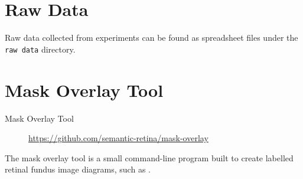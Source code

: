\section{Raw Data} \label{cha:raw_data}

Raw data collected from experiments can be found as spreadsheet files under the \lstinline{raw data} directory.

\section{Mask Overlay Tool}
\begin{description}
\item[Mask Overlay Tool] \url{https://github.com/semantic-retina/mask-overlay}
\end{description}

The mask overlay tool is a small command-line program built to create labelled retinal fundus image diagrams, such as . 

